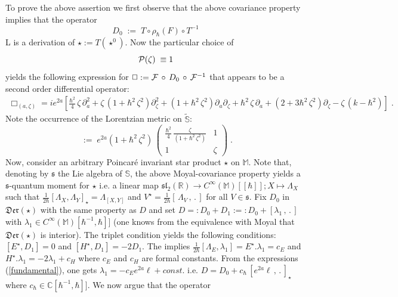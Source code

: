 \documentclass{article}
\renewcommand{\SS}{\mathbb S}
\newcommand{\R}{\mathbb R}
\newcommand{\MM}{\mathbb M}
\renewcommand{\ss}{\mathfrak s}
\newcommand{\Der}{\mathfrak{Der}}
\def\cf{{\cal F}}
\def\cp{{\cal P}}
\def \C{{\mathbb C}}
\def \R{{\mathbb R}}
\begin{document}
\noindent To prove the above assertion we first observe that the above covariance property implies that
the operator 
\begin{equation}\label{DERIV}
D_0\;:=\;T\circ\rho_\hbar(F)\circ T^{-1}
\end{equation}L
is a derivation of $\star:=T(\star^0)$. Now the particular choice of 
\begin{equation}
\cp(\zeta)\;\equiv1
\end{equation}
yields the following 
expression for $\Box:=\cf\,\circ\,D_0\,\circ\,\cf^{-1}$ that appears to be a second order differential operator:
\begin{eqnarray}\label{box1}
 \Box_{(a,\zeta)} = i e^{2a} \left[   \frac{\hbar^2}4\,\zeta\,
\partial_a^2 + \zeta\, (1+\hbar^2\, \zeta^2) \partial_\zeta^2 + (1+\hbar ^2
\, \zeta^2) \partial_a \partial_\zeta + \hbar^2 \,\zeta\, \partial_a  +  (2 + 3 \hbar^2 \, \zeta^2)
\partial_\zeta - \zeta\,(k-\hbar^2) \right] \;.\label{Box0}
\end{eqnarray}
Note the occurrence of the Lorentzian metric on $\tilde{\SS}$:
\begin{equation}
[g^{ij}]\;:=\;e^{2a}(1+\hbar ^2
\, \zeta^2) \,\left(
\begin{array}{cc}
 \frac{\hbar^2}4\,\frac{\zeta}{(1+\hbar ^2
\, \zeta^2) } & 1\\
1 & \zeta
\end{array}
\right)\;.
\end{equation}
Now, consider an arbitrary Poincar\'e invariant star product $\star$ on $\MM$. Note  that, denoting by $\ss$ the Lie algebra of $\SS$, the above Moyal-covariance property yields a $\ss$-quantum moment for $\star $ i.e. a linear map $\mathfrak{sl}_2(\R)\to C^\infty(\MM)[[\hbar]];X\mapsto\Lambda_X$ such that $\frac{1}{2\hbar}[\Lambda_X,\Lambda_Y]_\star=\Lambda_{[X,Y]}$ and $V^\star=\frac{1}{2\hbar}[\,\Lambda_V\,,\,.\,]$
for all $V\in\ss$. Fix $D_0$ in $\Der(\star)$ with the same property as $D$ and set $D=:D_0+D_1:=:D_0+[\lambda_1\,,\,.\,]$
with $\lambda_1\in C^\infty(\MM)[\hbar^{-1},\hbar]]$ (one knows from the equivalence with Moyal that $\Der(\star)$ is interior). The triplet condition yields the following conditions: $[E^\star,D_1]=0$ and $[H^\star,D_1]=-2D_1$.
The implies $\frac{1}{2\hbar}[\Lambda_E,\lambda_1]=E^\star.\lambda_1=c_E$ and $H^\star.\lambda_1=-2\lambda_1+c_H$ where $c_E$ and $c_H$ are formal constants. From the expressions (\ref{fundamental}),
one gets $\lambda_1=-c_Ee^{2a}\ell+const.$ i.e. $D=D_0+c_\hbar\,[e^{2a}\ell\,,\,.\,]_\star$ where $c_\hbar\in\C[\hbar^{-1},\hbar]]$. We now argue that the operator 
\end{document}
